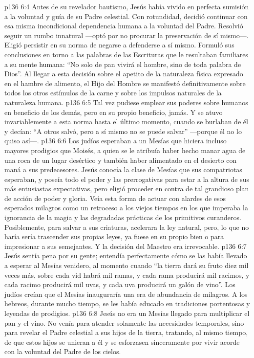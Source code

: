 \vs p136 6:4 Antes de su revelador bautismo, Jesús había vivido en perfecta sumisión a la voluntad y guía de su Padre celestial. Con rotundidad, decidió continuar con esa misma incondicional dependencia humana a la voluntad del Padre. Resolvió seguir un rumbo innatural ---optó por no procurar la preservación de sí mismo---. Eligió persistir en su norma de negarse a defenderse a sí mismo. Formuló sus conclusiones en torno a las palabras de las Escrituras que le resultaban familiares a su mente humana: “No solo de pan vivirá el hombre, sino de toda palabra de Dios”. Al llegar a esta decisión sobre el apetito de la naturaleza física expresado en el hambre de alimento, el Hijo del Hombre se manifestó definitivamente sobre todos los otros estímulos de la carne y sobre los impulsos naturales de la naturaleza humana.
\vs p136 6:5 Tal vez pudiese emplear sus poderes sobre humanos en beneficio de los demás, pero en su propio beneficio, jamás. Y se atuvo invariablemente a esta norma hasta el último momento, cuando se burlaban de él y decían: “A otros salvó, pero a sí mismo no se puede salvar” ---porque él no lo quiso así---.
\vs p136 6:6 Los judíos esperaban a un Mesías que hiciera incluso mayores prodigios que Moisés, a quien se le atribuía haber hecho manar agua de una roca de un lugar desértico y también haber alimentado en el desierto con maná a sus predecesores. Jesús conocía la clase de Mesías que sus compatriotas esperaban, y poseía todo el poder y las prerrogativas para estar a la altura de sus más entusiastas expectativas, pero eligió proceder en contra de tal grandioso plan de acción de poder y gloria. Veía esta forma de actuar con alardes de esos esperados milagros como un retroceso a los viejos tiempos en los que imperaba la ignorancia de la magia y las degradadas prácticas de los primitivos curanderos. Posiblemente, para salvar a sus criaturas, acelerara la ley natural, pero, lo que no haría sería trascender sus propias leyes, ya fuese en su propio bien o para impresionar a sus semejantes. Y la decisión del Maestro era irrevocable.
\vs p136 6:7 Jesús sentía pena por su gente; entendía perfectamente cómo se las había llevado a esperar al Mesías venidero, al momento cuando “la tierra dará su fruto diez mil veces más, sobre cada vid habrá mil ramas, y cada rama producirá mil racimos, y cada racimo producirá mil uvas, y cada uva producirá un galón de vino”. Los judíos creían que el Mesías inauguraría una era de abundancia de milagros. A los hebreos, durante mucho tiempo, se les había educado en tradiciones portentosas y leyendas de prodigios.
\vs p136 6:8 Jesús no era un Mesías llegado para multiplicar el pan y el vino. No venía para atender solamente las necesidades temporales, sino para revelar el Padre celestial a sus hijos de la tierra, tratando, al mismo tiempo, de que estos hijos se unieran a él y se esforzasen sinceramente por vivir acorde con la voluntad del Padre de los cielos.
